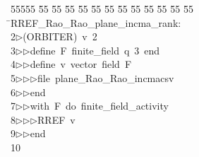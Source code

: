%
%
\begin{tabbing}
55555 \= 55 \= 55 \= 55 \= 55 \= 55 \= 55 \= 55 \= 55 \= 55 \= 55 \= 55 \= 55 \= \>RREF\_Rao\_Rao\_plane\_incma\_rank:\\[0pt]
2\>$\triangleright$\>(ORBITER)\ v\ 2\ \\[0pt]
3\>$\triangleright$\>$\triangleright$\>define\ F\ finite\_field\ q\ 3\ end\ \\[0pt]
4\>$\triangleright$\>$\triangleright$\>define\ v\ vector\ field\ F\ \ \\[0pt]
5\>$\triangleright$\>$\triangleright$\>$\triangleright$\>file\ plane\_Rao\_Rao\_incmacsv\ \\[0pt]
6\>$\triangleright$\>$\triangleright$\>end\ \\[0pt]
7\>$\triangleright$\>$\triangleright$\>with\ F\ do\ finite\_field\_activity\ \\[0pt]
8\>$\triangleright$\>$\triangleright$\>$\triangleright$\>RREF\ v\ \\[0pt]
9\>$\triangleright$\>$\triangleright$\>end\\[0pt]
10\>\end{tabbing}
